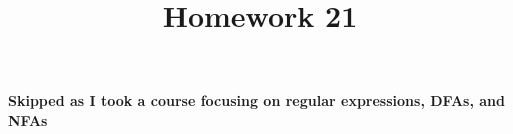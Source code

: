 \documentclass{article}
\begin{document}
\title{Homework 21}
\date{}
\maketitle

\paragraph{\Large Skipped as I took a course focusing on regular expressions, DFAs, and NFAs}
\end{document}
